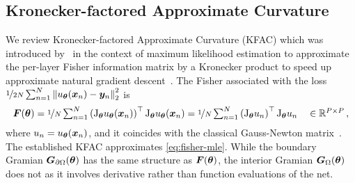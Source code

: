 \subsection{Kronecker-factored Approximate Curvature}\label{sec:kfac-background}

We review Kronecker-factored Approximate Curvature (KFAC) which was introduced by~\citet{heskes2000natural, martens2015optimizing} in the context of maximum likelihood estimation to approximate the per-layer Fisher information matrix by a Kronecker product to speed up approximate natural gradient descent~\cite{amari1998natural}.
The Fisher associated with the loss $\nicefrac{1}{2N} \sum_{n=1}^N \left\lVert u_{\bm{\theta}}({\bm{x}}_n) - {\bm{y}}_n \right\rVert_2^2$ is
\begin{equation}\label{eq:fisher-mle}
  {\bm{F}}({\bm{\theta}})
  =
  \nicefrac{1}{N}
  \textstyle
  \sum_{n=1}^N
  \left(\mathrm{J}_{{\bm{\theta}}} u_{{\bm{\theta}}}({\bm{x}}_n)  \right)^\top
  \mathrm{J}_{{\bm{\theta}}} u_{{\bm{\theta}}}({\bm{x}}_n)
  =
  \nicefrac{1}{N}
  \textstyle
  \sum_{n=1}^N
  \left( \mathrm{J}_{{\bm{\theta}}} u_n \right)^\top
  \mathrm{J}_{{\bm{\theta}}} u_n
  \quad\in {\mathbb{R}}^{P\times P}\,,
\end{equation}
where $u_n = u_{\bm{\theta}}({\bm{x}}_n)$, and it coincides with the classical Gauss-Newton matrix~\citep{martens2020new}.
The established KFAC approximates \eqref{eq:fisher-mle}.
While the boundary Gramian ${\bm{G}}_{\partial\Omega}({\bm{\theta}})$ has the same structure as ${\bm{F}}({\bm{\theta}})$, the interior Gramian ${\bm{G}}_\Omega({\bm{\theta}})$ does not as it involves derivative rather than function evaluations of the net.

